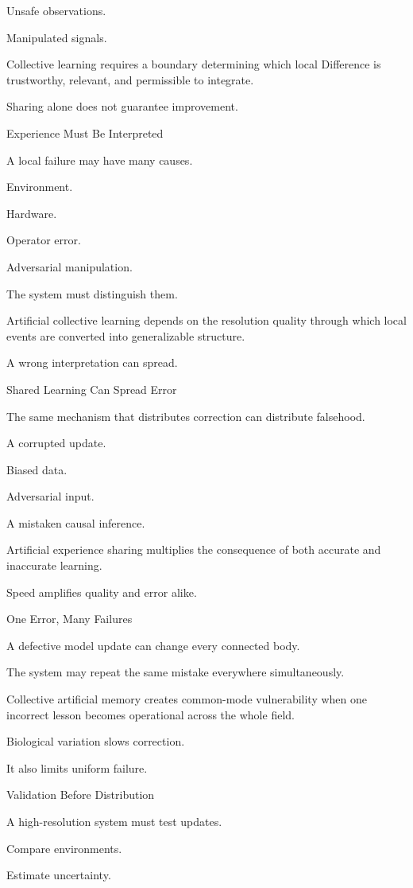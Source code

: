 Unsafe observations.

Manipulated signals.

Collective learning requires a boundary determining which local Difference is trustworthy, relevant, and permissible to integrate.

Sharing alone does not guarantee improvement.

Experience Must Be Interpreted

A local failure may have many causes.

Environment.

Hardware.

Operator error.

Adversarial manipulation.

The system must distinguish them.

Artificial collective learning depends on the resolution quality through which local events are converted into generalizable structure.

A wrong interpretation can spread.

Shared Learning Can Spread Error

The same mechanism that distributes correction can distribute falsehood.

A corrupted update.

Biased data.

Adversarial input.

A mistaken causal inference.

Artificial experience sharing multiplies the consequence of both accurate and inaccurate learning.

Speed amplifies quality and error alike.

One Error, Many Failures

A defective model update can change every connected body.

The system may repeat the same mistake everywhere simultaneously.

Collective artificial memory creates common-mode vulnerability when one incorrect lesson becomes operational across the whole field.

Biological variation slows correction.

It also limits uniform failure.

Validation Before Distribution

A high-resolution system must test updates.

Compare environments.

Estimate uncertainty.

